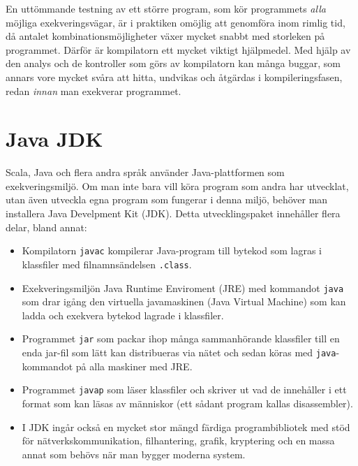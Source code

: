 En uttömmande testning av ett större program, som kör programmets \textit{alla} möjliga exekveringsvägar, är i praktiken omöjlig att genomföra inom rimlig tid, då antalet kombinationsmöjligheter växer mycket snabbt med storleken på programmet. 
Därför är kompilatorn ett mycket viktigt hjälpmedel. Med hjälp av den analys och de kontroller som görs av kompilatorn kan många buggar, som annars vore mycket svåra att hitta, undvikas och åtgärdas i kompileringsfasen, redan \textit{innan} man exekverar programmet. 


\section{Java JDK}

Scala, Java och flera andra språk använder Java-plattformen som exekveringsmiljö. Om man inte bara vill köra program som andra har utvecklat, utan även utveckla egna program som fungerar i denna miljö, behöver man installera Java Develpment Kit (JDK). Detta utvecklingspaket innehåller flera delar, bland annat:

\begin{itemize}

\item Kompilatorn \texttt{javac} kompilerar Java-program till bytekod som lagras i klassfiler med filnamnsändelsen \texttt{.class}.

\item Exekveringsmiljön Java Runtime Enviroment (JRE) med kommandot \texttt{java} som drar igång den virtuella javamaskinen (Java Virtual Machine) som kan ladda och exekvera bytekod lagrade i klassfiler.

\item Programmet \texttt{jar} som packar ihop många sammanhörande klassfiler till en enda jar-fil som lätt kan distribueras via nätet och sedan köras med \texttt{java}-kommandot på alla maskiner med JRE. 

\item Programmet \texttt{javap} som läser klassfiler och skriver ut vad de innehåller i ett format som kan läsas av människor (ett sådant program kallas disassembler).

\item I JDK ingår också en mycket stor mängd färdiga programbibliotek med stöd för nätverkskommunikation, filhantering, grafik, kryptering och en massa annat som behövs när man bygger moderna system. 

\end{itemize}  

